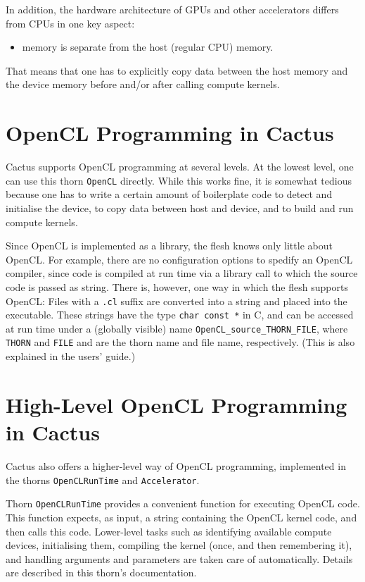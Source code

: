 In addition, the hardware architecture of GPUs and other accelerators
differs from CPUs in one key aspect:
\begin{itemize}
\item memory is separate from the host (regular CPU) memory.
\end{itemize}
That means that one has to explicitly copy data between the host
memory and the device memory before and/or after calling compute
kernels.

\section{OpenCL Programming in Cactus}

Cactus supports OpenCL programming at several levels. At the lowest
level, one can use this thorn \texttt{OpenCL} directly. While this
works fine, it is somewhat tedious because one has to write a certain
amount of boilerplate code to detect and initialise the device, to
copy data between host and device, and to build and run compute
kernels.

Since OpenCL is implemented as a library, the flesh knows only little
about OpenCL\@. For example, there are no configuration options to
spedify an OpenCL compiler, since code is compiled at run time via a
library call to which the source code is passed as string. There is,
however, one way in which the flesh supports OpenCL: Files with a
\texttt{.cl} suffix are converted into a string and placed into the
executable. These strings have the type \texttt{char~const~*} in C,
and can be accessed at run time under a (globally visible) name
\texttt{OpenCL\_source\_THORN\_FILE}, where \texttt{THORN} and
\texttt{FILE} and are the thorn name and file name, respectively.
(This is also explained in the users' guide.)

\section{High-Level OpenCL Programming in Cactus}

Cactus also offers a higher-level way of OpenCL programming,
implemented in the thorns \texttt{OpenCLRunTime} and
\texttt{Accelerator}.

Thorn \texttt{OpenCLRunTime} provides a convenient function for
executing OpenCL code. This function expects, as input, a string
containing the OpenCL kernel code, and then calls this code.
Lower-level tasks such as identifying available compute devices,
initialising them, compiling the kernel (once, and then remembering
it), and handling arguments and parameters are taken care of
automatically. Details are described in this thorn's documentation.

